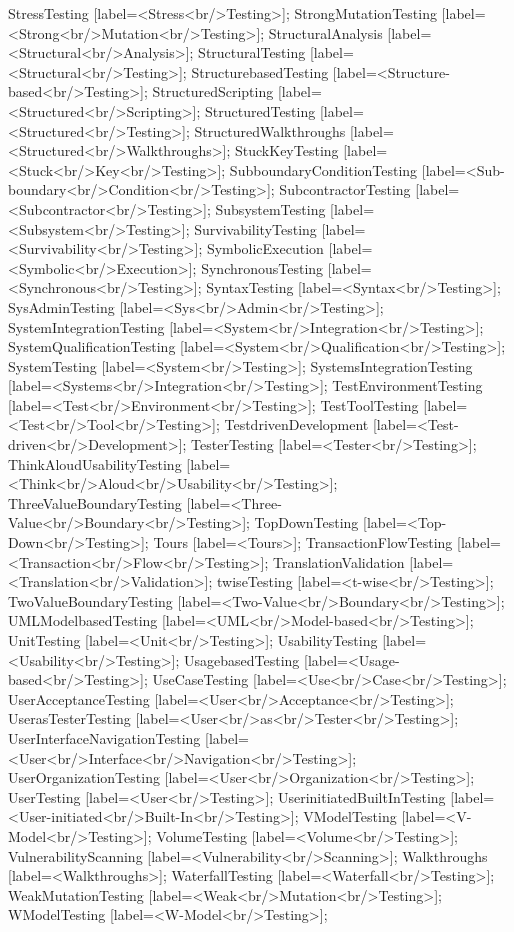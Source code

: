 \documentclass{article}
\begin{document}
{StressTesting [label=<Stress<br/>Testing>];
StrongMutationTesting [label=<Strong<br/>Mutation<br/>Testing>];
StructuralAnalysis [label=<Structural<br/>Analysis>];
StructuralTesting [label=<Structural<br/>Testing>];
StructurebasedTesting [label=<Structure-based<br/>Testing>];
StructuredScripting [label=<Structured<br/>Scripting>];
StructuredTesting [label=<Structured<br/>Testing>];
StructuredWalkthroughs [label=<Structured<br/>Walkthroughs>];
StuckKeyTesting [label=<Stuck<br/>Key<br/>Testing>];
SubboundaryConditionTesting [label=<Sub-boundary<br/>Condition<br/>Testing>];
SubcontractorTesting [label=<Subcontractor<br/>Testing>];
SubsystemTesting [label=<Subsystem<br/>Testing>];
SurvivabilityTesting [label=<Survivability<br/>Testing>];
SymbolicExecution [label=<Symbolic<br/>Execution>];
SynchronousTesting [label=<Synchronous<br/>Testing>];
SyntaxTesting [label=<Syntax<br/>Testing>];
SysAdminTesting [label=<Sys<br/>Admin<br/>Testing>];
SystemIntegrationTesting [label=<System<br/>Integration<br/>Testing>];
SystemQualificationTesting [label=<System<br/>Qualification<br/>Testing>];
SystemTesting [label=<System<br/>Testing>];
SystemsIntegrationTesting [label=<Systems<br/>Integration<br/>Testing>];
TestEnvironmentTesting [label=<Test<br/>Environment<br/>Testing>];
TestToolTesting [label=<Test<br/>Tool<br/>Testing>];
TestdrivenDevelopment [label=<Test-driven<br/>Development>];
TesterTesting [label=<Tester<br/>Testing>];
ThinkAloudUsabilityTesting [label=<Think<br/>Aloud<br/>Usability<br/>Testing>];
ThreeValueBoundaryTesting [label=<Three-Value<br/>Boundary<br/>Testing>];
TopDownTesting [label=<Top-Down<br/>Testing>];
Tours [label=<Tours>];
TransactionFlowTesting [label=<Transaction<br/>Flow<br/>Testing>];
TranslationValidation [label=<Translation<br/>Validation>];
twiseTesting [label=<t-wise<br/>Testing>];
TwoValueBoundaryTesting [label=<Two-Value<br/>Boundary<br/>Testing>];
UMLModelbasedTesting [label=<UML<br/>Model-based<br/>Testing>];
UnitTesting [label=<Unit<br/>Testing>];
UsabilityTesting [label=<Usability<br/>Testing>];
UsagebasedTesting [label=<Usage-based<br/>Testing>];
UseCaseTesting [label=<Use<br/>Case<br/>Testing>];
UserAcceptanceTesting [label=<User<br/>Acceptance<br/>Testing>];
UserasTesterTesting [label=<User<br/>as<br/>Tester<br/>Testing>];
UserInterfaceNavigationTesting [label=<User<br/>Interface<br/>Navigation<br/>Testing>];
UserOrganizationTesting [label=<User<br/>Organization<br/>Testing>];
UserTesting [label=<User<br/>Testing>];
UserinitiatedBuiltInTesting [label=<User-initiated<br/>Built-In<br/>Testing>];
VModelTesting [label=<V-Model<br/>Testing>];
VolumeTesting [label=<Volume<br/>Testing>];
VulnerabilityScanning [label=<Vulnerability<br/>Scanning>];
Walkthroughs [label=<Walkthroughs>];
WaterfallTesting [label=<Waterfall<br/>Testing>];
WeakMutationTesting [label=<Weak<br/>Mutation<br/>Testing>];
WModelTesting [label=<W-Model<br/>Testing>];

}
\end{document}
